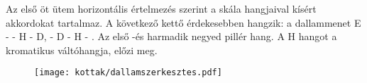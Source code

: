 Az első öt ütem horizontális értelmezés szerint a skála hangjaival kísért akkordokat tartalmaz.
A következő kettő érdekesebben hangzik: a dallammenet  E - \aisz - H - D, \gisz - D - H - \gisz. Az első -és harmadik negyed pillér hang. A H hangot a kromatikus váltóhangja, \aisz előzi meg.

\begin{figure}[!htbp]
 \advance\leftskip-6mm
 \texttt{[image: kottak/dallamszerkesztes.pdf]}
\end{figure}

